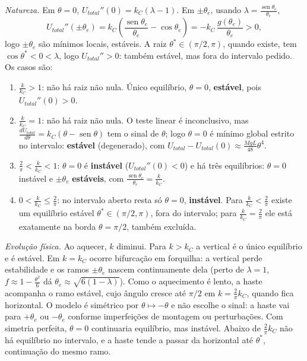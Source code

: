 \documentclass{article}%
\begin{document}
\textit{Natureza.} Em $\theta=0$, $U_{total}''(0)=k_C(\lambda-1)$. Em $\pm\theta_e$, usando $\lambda=\frac{\operatorname{sen}\theta_e}{\theta_e}$,
\[
U_{total}''(\pm\theta_e)=k_C\left(\frac{\operatorname{sen}\theta_e}{\theta_e}-\cos\theta_e\right)=-k_C\,\frac{g(\theta_e)}{\theta_e}>0,
\]
logo $\pm\theta_e$ são mínimos locais, estáveis. A raiz $\theta^*\in(\pi/2,\pi)$, quando existe, tem $\cos\theta^*<0<\lambda$, logo $U_{total}''>0$: também estável, mas fora do intervalo pedido. Os casos são:
\begin{enumerate}
\item $\frac{k}{k_C}>1$: não há raiz não nula. Único equilíbrio, $\theta=0$, \textbf{estável}, pois $U_{total}''(0)>0$.
\item $\frac{k}{k_C}=1$: não há raiz não nula. O teste linear é inconclusivo, mas $\frac{dU_{total}}{d\theta}=k_C(\theta-\operatorname{sen}\theta)$ tem o sinal de $\theta$; logo $\theta=0$ é mínimo global estrito no intervalo: \textbf{estável} (degenerado), com $U_{total}-U_{total}(0)\approx\frac{MgL}{48}\theta^4$.
\item $\frac{2}{\pi}<\frac{k}{k_C}<1$: $\theta=0$ é \textbf{instável} ($U_{total}''(0)<0$) e há três equilíbrios: $\theta=0$ instável e $\pm\theta_e$ \textbf{estáveis}, com $\frac{\operatorname{sen}\theta_e}{\theta_e}=\frac{k}{k_C}$.
\item $0<\frac{k}{k_C}\le\frac{2}{\pi}$: no intervalo aberto resta só $\theta=0$, \textbf{instável}. Para $\frac{k}{k_C}<\frac{2}{\pi}$ existe um equilíbrio estável $\theta^*\in(\pi/2,\pi)$, fora do intervalo; para $\frac{k}{k_C}=\frac{2}{\pi}$ ele está exatamente na borda $\theta=\pi/2$, também excluída.
\end{enumerate}

\textit{Evolução física.} Ao aquecer, $k$ diminui. Para $k>k_C$ a vertical é o único equilíbrio e é estável. Em $k=k_C$ ocorre bifurcação em forquilha: a vertical perde estabilidade e os ramos $\pm\theta_e$ nascem continuamente dela (perto de $\lambda=1$, $f\approx 1-\frac{\theta^2}{6}$ dá $\theta_e\approx\sqrt{6(1-\lambda)}$). Como o aquecimento é lento, a haste acompanha o ramo estável, cujo ângulo cresce até $\pi/2$ em $k=\frac{2}{\pi}k_C$, quando fica horizontal. O modelo é simétrico por $\theta\mapsto-\theta$ e não escolhe o sinal: a haste vai para $+\theta_e$ ou $-\theta_e$ conforme imperfeições de montagem ou perturbações. Com simetria perfeita, $\theta=0$ continuaria equilíbrio, mas instável. Abaixo de $\frac{2}{\pi}k_C$ não há equilíbrio no intervalo, e a haste tende a passar da horizontal até $\theta^*$, continuação do mesmo ramo.
\end{document}
